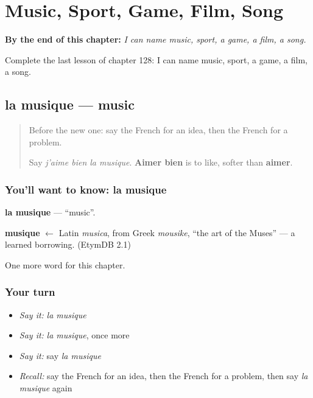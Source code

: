 
\chapter{Music, Sport, Game, Film, Song}
\label{ch:fr-music-sport-game-film-song}

\begin{chapteropening}
\textbf{By the end of this chapter:} \emph{I can name music, sport, a game, a film, a song.}

Complete the last lesson of chapter 128: I can name music, sport, a game, a film, a song.
\end{chapteropening}

\section[la musique]{la musique — music}

\label{lesson:FR-C128-musique}



\begin{quote}
Before the new one: say the French for an idea, then the French for a problem.

Say \emph{j'aime bien la musique}. \textbf{Aimer bien} is to like, softer than \textbf{aimer}.
\end{quote}

\subsection*{You'll want to know: la musique}
\textbf{la musique} — \textquotedblleft{}music\textquotedblright{}.

\begin{cousinweb}
\textbf{musique} $\leftarrow$ Latin \emph{musica}, from Greek \emph{mousike}, \textquotedblleft{}the art of the Muses\textquotedblright{} — a learned borrowing. (EtymDB 2.1)
\end{cousinweb}

\begin{grammarlens}[title={What you've built}]
One more word for this chapter.
\end{grammarlens}

\subsection*{Your turn}
\begin{itemize}
\raggedright
  \item \emph{Say it:} \emph{la musique}
  \item \emph{Say it:} \emph{la musique}, once more
  \item \emph{Say it:} say \emph{la musique}
  \item \emph{Recall:} say the French for an idea, then the French for a problem, then say \emph{la musique} again
\end{itemize}

